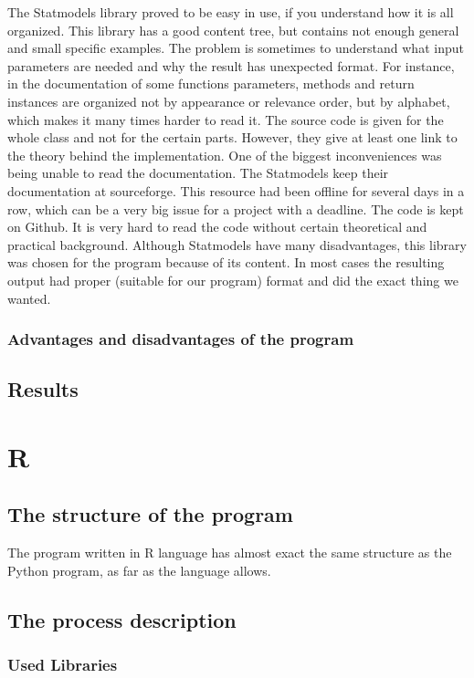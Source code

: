 \documentclass{article}
\begin{document}
The Statmodels library proved to be easy in use, if you understand how it is all organized. This library has a good content tree, but contains not enough general and small specific examples. The problem is sometimes to understand what input parameters are needed and why the result has unexpected format. For instance, in the documentation of some functions parameters, methods and return instances are organized not by appearance or relevance order, but by alphabet, which makes it many times harder to read it. The source code is given for the whole class and not for the certain parts. However, they give at least one link to the theory behind the implementation. One of the biggest inconveniences was being unable to read the documentation. The Statmodels keep their documentation at sourceforge. This resource had been offline for several days in a row, which can be a very big issue for a project with a deadline. The code is kept on Github. It is very hard to read the code without certain theoretical and practical background. Although Statmodels have many disadvantages, this library was chosen for the program because of its content. In most cases the resulting output had proper (suitable for our program) format and did the exact thing we wanted.\\

\subsubsection{Advantages and disadvantages of the program}

\subsection{Results}

\newpage
\section{R}
\subsection{The structure of the program}
The program written in R language has almost exact the same structure as the Python program, as far as the language allows. 
\subsection{The process description}
\subsubsection{Used Libraries}
\end{document}
